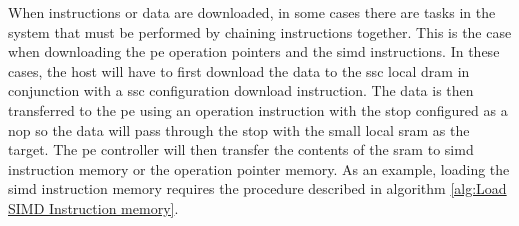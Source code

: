 When instructions or data are downloaded, in some cases there are tasks in the system that must be performed by chaining instructions together.
This is the case when downloading the \ac{pe} operation pointers and the \ac{simd} instructions.
In these cases, the host will have to first download the data to the \ac{ssc} local \ac{dram} in conjunction with a \ac{ssc} configuration download instruction.
The data is then transferred to the \ac{pe} using an operation instruction with the \ac{stop} configured as a \ac{nop} so the data will pass through the \ac{stop} with the small local \ac{sram} as the target. 
The \ac{pe} controller will then transfer the contents of the \ac{sram} to \ac{simd} instruction memory or the operation pointer memory.
As an example, loading the \ac{simd} instruction memory requires the procedure described in algorithm \ref{alg:Load SIMD Instruction memory}.

